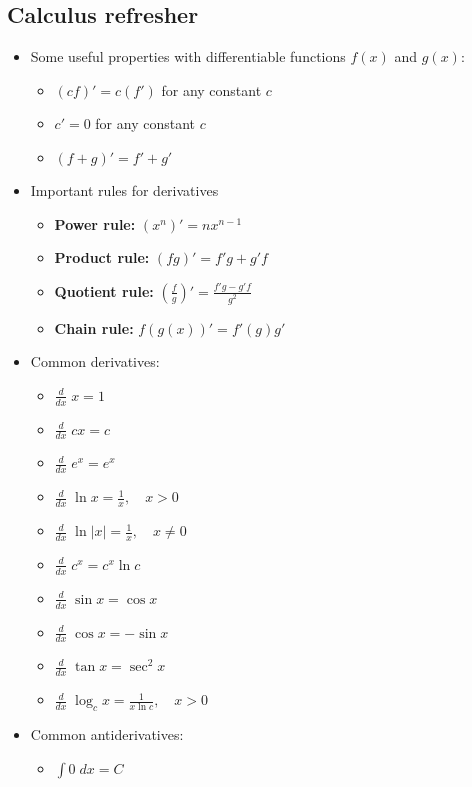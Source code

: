 \documentclass{article}
\begin{document}
\begin{multicols*}{2}
\subsection{Calculus refresher}
\begin{itemize}
    \item Some useful properties with differentiable functions $f(x)$ and $g(x)$:
    \begin{itemize}
        \item $(cf)' = c(f')$ for any constant $c$
        \item $c' = 0$ for any constant $c$
        \item $(f+g)' = f' + g'$
    \end{itemize}
    \item Important rules for derivatives
    \begin{itemize}
        \item \textbf{Power rule:} $(x^n)' = nx^{n-1}$
        \item \textbf{Product rule:} $(fg)' = f'g + g'f$
        \item \textbf{Quotient rule:} $(\frac{f}{g})' = \frac{f'g - g'f}{g^2}$
        \item \textbf{Chain rule:} $f(g(x))' = f'(g)g'$
    \end{itemize}
    \item Common derivatives:
    \begin{itemize}
        \item $\frac{d}{dx}\; x = 1$
        \item $\frac{d}{dx}\; cx = c$
        \item $\frac{d}{dx}\; e^x = e^x$
        \item $\frac{d}{dx}\; \ln{x} = \frac{1}{x}, \quad x > 0$
        \item $\frac{d}{dx}\; \ln{\lvert x \rvert}= \frac{1}{x}, \quad x \neq 0$
        \item $\frac{d}{dx}\; c^x = c^x \ln{c}$
        \item $\frac{d}{dx}\; \sin{x} = \cos{x}$
        \item $\frac{d}{dx}\; \cos{x} = -\sin{x}$
        \item $\frac{d}{dx}\; \tan{x} = \sec^2{x}$
        \item $\frac{d}{dx}\; \log_c{x}=\frac{1}{x\ln{c}}, \quad x > 0 $
    \end{itemize}
    \item Common antiderivatives:
    \begin{itemize}
        \item $\int 0 \;dx = C$

\end{itemize}
\end{itemize}
\end{multicols*}
\end{document}

